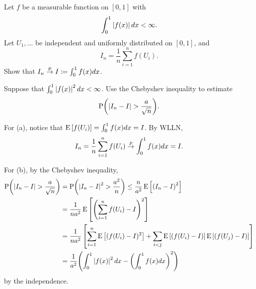 \documentclass[a4paper, 12pt]{article}
\begin{document}
\begin{exercise}{2.8}\hspace{1em}\vspace{-1.5em}
    \begin{thmenum}
        \item Let $f$ be a measurable function on $[0,1]$ with 
        \begin{equation*}
            \int_0^1 \left\lvert {f(x)} \right\rvert dx <\infty. 
        \end{equation*}
        Let $U_1,\ldots$ be independent and uniformly distributed on $[0,1]$, and 
        \begin{equation*}
            I_n = \frac{1}{n}\sum_{i=1}^nf(U_i). 
        \end{equation*}
        Show that $I_n\overset{p}{\to} I\coloneq\int_0^1 f(x)dx$. 
        \item Suppose that $\int_0^1\left\lvert {f(x)} \right\rvert^2dx < \infty$. Use the Chebyshev 
        inequality to estimate 
        \begin{equation*}
            \P\pth{\abs{I_n - I} > \frac{a}{\sqrt{n}}}. 
        \end{equation*} 
    \end{thmenum}
\end{exercise}
\begin{solution}
    For (a), notice that $\operatorname{E}\left[ {f(U_i)} \right] = \int_0^1 f(x)dx = I$.  
    By WLLN, 
    \begin{equation*}
        I_n = \frac{1}{n}\sum_{i=1}^nf(U_i) \overset{p}{\to} \int_0^1f(x)dx = I. 
    \end{equation*}

    For (b), by the Chebyshev inequality, 
    \begin{equation*}
        \begin{split}
            \P\pth{\abs{I_n - I} > \frac{a}{\sqrt{n}}} &= 
            \P\pth{\abs{I_n - I}^2 > \frac{a^2}{n}} 
            \leq \frac{n}{a^2}\E\sbrc{\pth{I_n - I}^2} \\ 
            &= \frac{1}{na^2}\E\sbrc{\pth{\sum_{i=1}^n f(U_i) - I}^2} \\
            &= \frac{1}{na^2}\sbrc{\sum_{i=1}^n\E\sbrc{(f(U_i) - I)^2} + \sum_{i<j}\E\sbrc{(f(U_i) - I)}\E\sbrc{(f(U_j) - I)}} \\ 
            &= \frac{1}{a^2}\pth{\int_0^1 \abs{f(x)}^2dx - \pth{\int_0^1f(x)dx}^2}
        \end{split}
    \end{equation*}
    by the independence. 
\end{solution}
\end{document}
